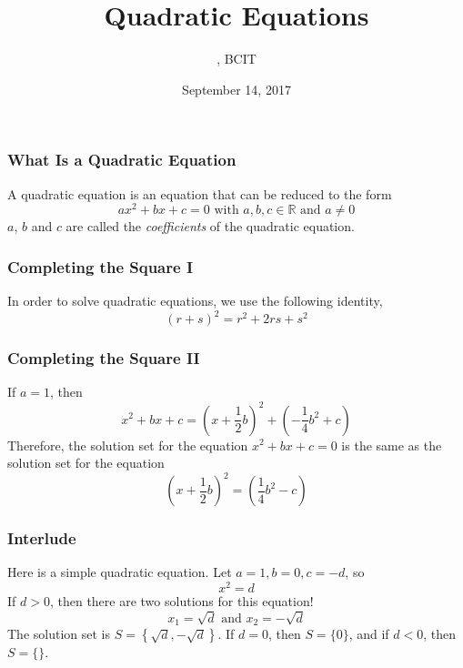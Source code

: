 \documentclass[xcolor=dvipsnames]{beamer}
\title{Quadratic Equations}
\subtitle{{\CourseNumber}, BCIT}
\author{\CourseName}
\date{September 14, 2017}
\begin{document}
\begin{frame}
  \titlepage
\end{frame}

\begin{frame}
  \frametitle{What Is a Quadratic Equation}
A quadratic equation is an equation that can be reduced to the form
\begin{equation}
  \label{eq:paezohmu}
  ax^{2}+bx+c=0\mbox{ with }a,b,c\in\mathbb{R}\mbox{ and }a\neq{}0
\end{equation}
$a$, $b$ and $c$ are called the \emph{coefficients} of the quadratic
equation.
\end{frame}

\begin{frame}
  \frametitle{Completing the Square I}
In order to solve quadratic equations, we use the following identity,
\begin{equation}
  \label{eq:uibaifoa}
  (r+s)^{2}=r^{2}+2rs+s^{2}
\end{equation}
\end{frame}

\begin{frame}
  \frametitle{Completing the Square II}
If $a=1$, then
\begin{equation}
  \label{eq:aiphohpi}
  x^{2}+bx+c=\left(x+\frac{1}{2}b\right)^{2}+\left(-\frac{1}{4}b^{2}+c\right)
\end{equation}
Therefore, the solution set for the equation $x^{2}+bx+c=0$ is the
same as the solution set for the equation
\begin{equation}
  \label{eq:diesaisi}
  \left(x+\frac{1}{2}b\right)^{2}=\left(\frac{1}{4}b^{2}-c\right)
\end{equation}
\end{frame}

\begin{frame}
  \frametitle{Interlude}
Here is a simple quadratic equation. Let $a=1,b=0,c=-d$, so
\begin{equation}
  \label{eq:nuphoomu}
  x^{2}=d
\end{equation}
If $d>0$, then there are two solutions for this equation!
\begin{equation}
  \label{eq:gephoopo}
  x_{1}=\sqrt{d}\mbox{ and }x_{2}=-\sqrt{d}
\end{equation}
The solution set is $S=\left\{\sqrt{d},-\sqrt{d}\right\}$. If $d=0$,
then $S=\{0\}$, and if $d<0$, then $S=\{\}$.
\end{frame}
\end{document}
